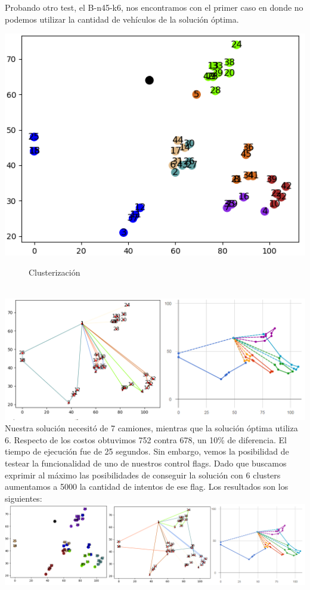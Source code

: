 \documentclass[11pt,a4paper]{article}
\begin{document}
\bigskip \bigskip
\bigskip


Probando otro test, el B-n45-k6, nos encontramos con el primer caso en donde no podemos utilizar la cantidad de vehículos de la solución óptima. 

\includegraphics[scale=.5]{graficos/B-n45-k6/cluster.png}
\begin{figure}[!h]
\caption{Clusterización}
\end{figure}
\\
\includegraphics[scale=.5]{graficos/B-n45-k6/caminos.png}
\\
Nuestra solución necesitó de 7 camiones, mientras que la solución óptima utiliza 6. Respecto de los costos obtuvimos 752 contra 678, un 10\% de diferencia. El tiempo de ejecución fue de 25 segundos. Sin embargo, vemos la posibilidad de testear la funcionalidad de uno de nuestros control flags. Dado que buscamos exprimir al máximo las posibilidades de conseguir la solución con 6 clusters aumentamos a 5000 la cantidad de intentos de ese flag. Los resultados son los siguientes:\\
\includegraphics[scale=.4]{graficos/B-n45-k6/caminos2.png}
\end{document}
